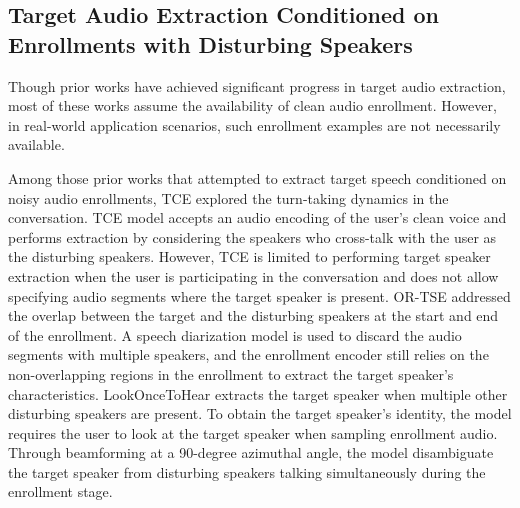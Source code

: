 






\subsection{Target Audio Extraction Conditioned on Enrollments with Disturbing Speakers}

Though prior works have achieved significant progress in target audio extraction, most of these works assume the availability of clean audio enrollment. However, in real-world application scenarios, such enrollment examples are not necessarily available. 

Among those prior works that attempted to extract target speech conditioned on noisy audio enrollments, TCE \cite{Chen2024tce} explored the turn-taking dynamics in the conversation. TCE model accepts an audio encoding of the user's clean voice and performs extraction by considering the speakers who cross-talk with the user as the disturbing speakers. However, TCE is limited to performing target speaker extraction when the user is participating in the conversation and does not allow specifying audio segments where the target speaker is present. 
OR-TSE \cite{zhang2024ortse} addressed the overlap between the target and the disturbing speakers at the start and end of the enrollment. A speech diarization model is used to discard the audio segments with multiple speakers, and the enrollment encoder still relies on the non-overlapping regions in the enrollment to extract the target speaker's characteristics. 
LookOnceToHear \cite{Veluri2024lookonce} extracts the target speaker when multiple other disturbing speakers are present. To obtain the target speaker's identity, the model requires the user to look at the target speaker when sampling enrollment audio. Through beamforming at a 90-degree azimuthal angle, the model disambiguate the target speaker from disturbing speakers talking simultaneously during the enrollment stage. 

